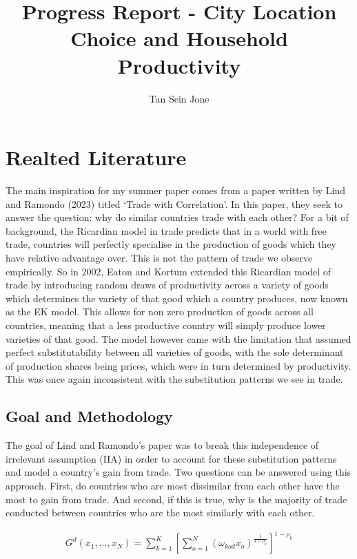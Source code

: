 \documentclass[10pt]{article}
\title{Progress Report - City Location Choice and Household Productivity}
\author{Tan Sein Jone}
\date{}
\begin{document}
\doublespacing
\maketitle

\section{Realted Literature}

The main inspiration for my summer paper comes from a paper written by Lind and Ramondo (2023) titled ‘Trade with Correlation’. In this paper, they seek to answer the question: why do similar countries trade with each other? For a bit of background, the Ricardian model in trade predicts that in a world with free trade, countries will perfectly specialise in the production of goods which they have relative advantage over. This is not the pattern of trade we observe empirically. So in 2002, Eaton and Kortum extended this Ricardian model of trade by introducing random draws of productivity across a variety of goods which determines the variety of that good which a country produces, now known as the EK model. This allows for non zero production of goods across all countries, meaning that a less productive country will simply produce lower varieties of that good. The model however came with the limitation that assumed perfect substitutability between all varieties of goods, with the sole determinant of production shares being prices, which were in turn determined by productivity. This was once again inconsistent with the substitution patterns we see in trade.

\subsection{Goal and Methodology}

The goal of Lind and Ramondo’s paper was to break this independence of irrelevant assumption (IIA) in order to account for these substitution patterns and model a country’s gain from trade. Two questions can be answered using this approach. First, do countries who are most dissimilar from each other have the most to gain from trade. And second, if this is true, why is the majority of trade conducted between countries who are the most similarly with each other.

\begin{align*}
    G^d(x_1, \dots, x_N) = \sum_{k = 1}^{K} \left[\sum_{o = 1}^{N} (\omega_{kod} x_o)^{\frac{1}{1 - \rho_k}}\right]^{1 - \rho_k}
\end{align*}
\end{document}
